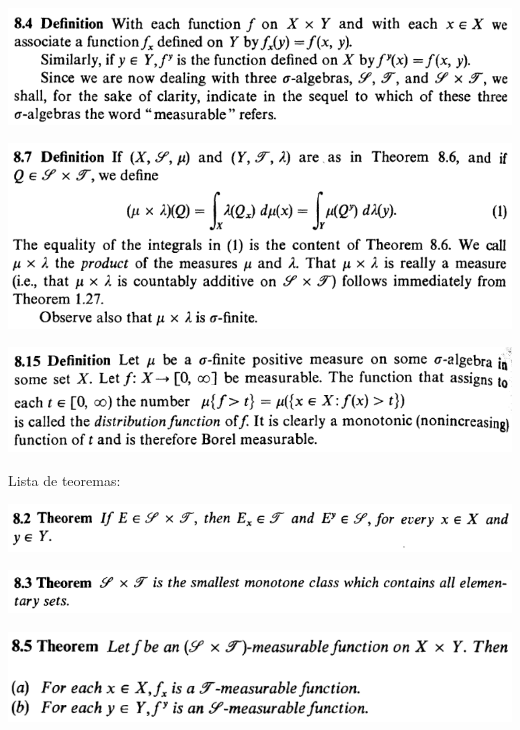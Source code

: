 \documentclass[12pt]{article}
\begin{document}
		\begin{center}
		\includegraphics{d8ponto4}
		\end{center}

		\begin{center}
		\includegraphics{d8ponto7}
		\end{center}

		\begin{center}
		\includegraphics{d8ponto15}
		\end{center}

Lista de teoremas:

		\begin{center}
		\includegraphics{8ponto2}
		\end{center}

		\begin{center}
		\includegraphics{8ponto3}
		\end{center}

		\begin{center}
		\includegraphics{8ponto5}
		\end{center}
\end{document}
